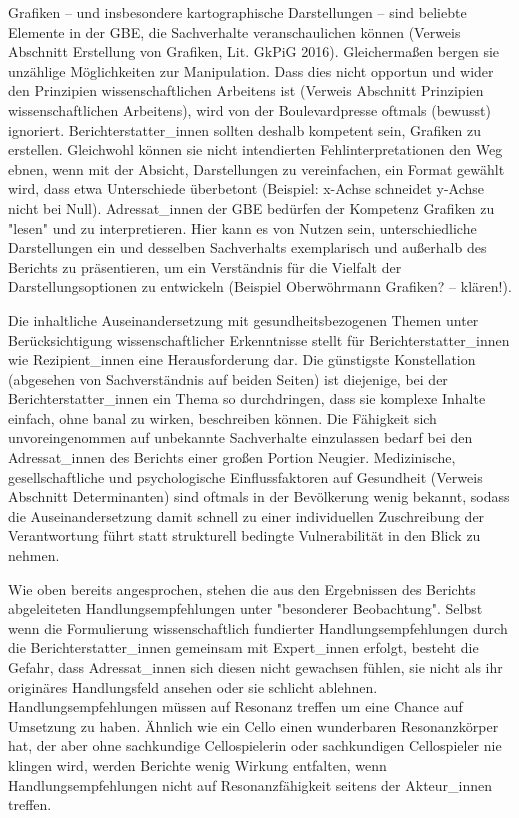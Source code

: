 \documentclass{article}
\begin{document}
Grafiken – und insbesondere kartographische Darstellungen – sind beliebte Elemente in der GBE, die Sachverhalte veranschaulichen können (Verweis Abschnitt Erstellung von Grafiken, Lit. GkPiG 2016). Gleichermaßen bergen sie unzählige Möglichkeiten zur Manipulation. Dass dies nicht opportun und wider den Prinzipien wissenschaftlichen Arbeitens ist (Verweis Abschnitt Prinzipien wissenschaftlichen Arbeitens), wird von der Boulevardpresse oftmals (bewusst) ignoriert. Berichterstatter\_innen sollten deshalb kompetent sein, Grafiken zu erstellen. Gleichwohl können sie nicht intendierten Fehlinterpretationen den Weg ebnen, wenn mit der Absicht, Darstellungen zu vereinfachen, ein Format gewählt wird, dass etwa Unterschiede überbetont (Beispiel: x-Achse schneidet y-Achse nicht bei Null). Adressat\_innen der GBE bedürfen der Kompetenz Grafiken zu "lesen" und zu interpretieren. Hier kann es von Nutzen sein, unterschiedliche Darstellungen ein und desselben Sachverhalts exemplarisch und außerhalb des Berichts zu präsentieren, um ein Verständnis für die Vielfalt der Darstellungsoptionen zu entwickeln (Beispiel Oberwöhrmann Grafiken? -- klären!). 

Die inhaltliche Auseinandersetzung mit gesundheitsbezogenen Themen unter Berücksichtigung wissenschaftlicher Erkenntnisse stellt für Berichterstatter\_innen wie Rezipient\_innen eine Herausforderung dar. Die günstigste Konstellation (abgesehen von Sachverständnis auf beiden Seiten) ist diejenige, bei der Berichterstatter\_innen ein Thema so durchdringen, dass sie komplexe Inhalte einfach, ohne banal zu wirken, beschreiben können. Die Fähigkeit sich unvoreingenommen auf unbekannte Sachverhalte einzulassen bedarf bei den Adressat\_innen des Berichts einer großen Portion Neugier. Medizinische, gesellschaftliche und psychologische Einflussfaktoren auf Gesundheit (Verweis Abschnitt Determinanten) sind oftmals in der Bevölkerung wenig bekannt, sodass die Auseinandersetzung damit schnell zu einer individuellen Zuschreibung der Verantwortung führt statt strukturell bedingte Vulnerabilität in den Blick zu nehmen.

Wie oben bereits angesprochen, stehen die aus den Ergebnissen des Berichts abgeleiteten Handlungsempfehlungen unter "besonderer Beobachtung". Selbst wenn die Formulierung wissenschaftlich fundierter Handlungsempfehlungen durch die Berichterstatter\_innen gemeinsam mit Expert\_innen erfolgt, besteht die Gefahr, dass Adressat\_innen sich diesen nicht gewachsen fühlen, sie nicht als ihr originäres Handlungsfeld ansehen oder sie schlicht ablehnen. Handlungsempfehlungen müssen auf Resonanz treffen um eine Chance auf Umsetzung zu haben. Ähnlich wie ein Cello einen wunderbaren Resonanzkörper hat, der aber ohne sachkundige Cellospielerin oder sachkundigen Cellospieler nie klingen wird, werden Berichte wenig Wirkung entfalten, wenn Handlungsempfehlungen nicht auf Resonanzfähigkeit seitens der Akteur\_innen treffen.





\subsubsection{}\label{H9112914}



\printbibliography[title={Literaturverzeichnis}]
\end{document}
